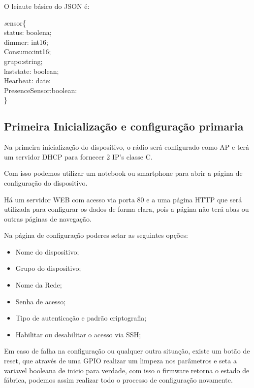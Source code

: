 \documentclass[openright]{normas-utf-tex} %
\begin{document}
O leiaute básico do JSON é:

\begin{center}
\textit
sensor\{\\ 
status: boolena; \\
dimmer: int16;\\
Consumo:int16; \\
grupo:string;\\
laststate: boolean;\\
Hearbeat: date: \\
PresenceSensor:boolean:\\
\}
\end{center}
\subsection{Primeira Inicialização e configuração primaria}


Na primeira inicialização do dispositivo, o rádio será configurado como AP e terá um servidor DHCP para fornecer 2 IP's classe C.

Com isso podemos utilizar um notebook ou smartphone para abrir a página de configuração do dispositivo.

Há  um servidor WEB com acesso via porta 80 e a uma página HTTP que será utilizada para configurar os dados de forma clara, pois a página não terá abas ou outras páginas de navegação.

Na página de configuração poderes setar as seguintes opções:
\begin{itemize}
    \item Nome do dispositivo;
    \item Grupo do dispositivo;
    \item Nome da Rede;
    \item Senha de acesso;
    \item Tipo de autenticação e padrão criptografia;
    \item Habilitar ou desabilitar o acesso via SSH;
\end{itemize}

Em caso de falha na configuração ou qualquer outra situação, existe um botão de reset, que através de uma GPIO \cite{Elsevier} realizar um limpeza nos parâmetros e seta a variavel booleana de inicio para verdade, com isso o firmware retorna o estado de fábrica, podemos assim realizar todo o processo de configuração novamente.
\end{document}
